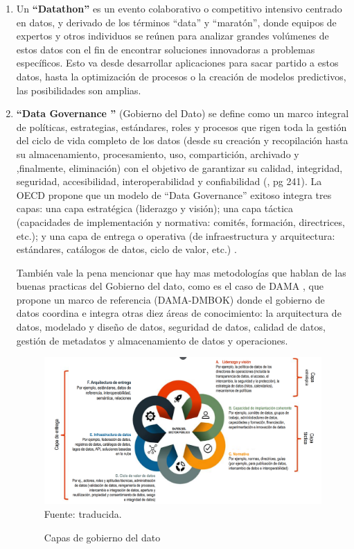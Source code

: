 \begin{enumerate}
	\item Un \textbf{``Datathon''} \label{def7} \citep{Datathon2016Anslow} es un evento colaborativo o competitivo intensivo centrado en datos, y derivado de los términos ``data'' y ``maratón'', donde equipos de expertos y otros individuos se reúnen para analizar grandes volúmenes de estos datos con el fin de encontrar soluciones innovadoras a problemas específicos. Esto va desde desarrollar aplicaciones para sacar partido a estos datos, hasta la optimización de procesos o la creación de modelos predictivos, las posibilidades son amplias. \\
	
	\item \textbf{``Data Governance ''} \label{def10} (Gobierno del Dato) se define como un marco integral de políticas, estrategias, estándares, roles y procesos que rigen toda la gestión del ciclo de vida completo de los datos (desde su creación y recopilación hasta su almacenamiento, procesamiento, uso, compartición, archivado y ,finalmente, eliminación) con el objetivo de garantizar su calidad, integridad, seguridad, accesibilidad, interoperabilidad y confiabilidad (\cite{HerreraCapriz2024}, pg 241). La OECD propone que un modelo de ``Data Governance'' exitoso integra tres capas: una capa estratégica (liderazgo y visión); una capa táctica (capacidades de implementación y normativa: comités, formación, directrices, etc.); y una capa de entrega o operativa (de infraestructura y arquitectura: estándares, catálogos de datos, ciclo de valor, etc.) \citep{OECD2019}.
	
	También vale la pena mencionar que hay mas metodologías que hablan de las buenas practicas del Gobierno del dato, como es el caso de DAMA \citep{Gob_metodologia_Dama}, que propone un marco de referencia (DAMA-DMBOK) donde el gobierno de datos coordina e integra otras diez áreas de conocimiento: la arquitectura de datos, modelado y diseño de datos, seguridad de datos, calidad de datos, gestión de metadatos y almacenamiento de datos y operaciones.
			
	\begin{figure}[h]
		\begin{center}
			\caption{Capas de gobierno del dato}
			\includegraphics[scale=0.3]{Imagenes/Bitmap/data_gobernance.png} 
			\footnotesize{Fuente: \citep{OECD2019} traducida.}
		\end{center}
	\end{figure}
	

\end{enumerate}
